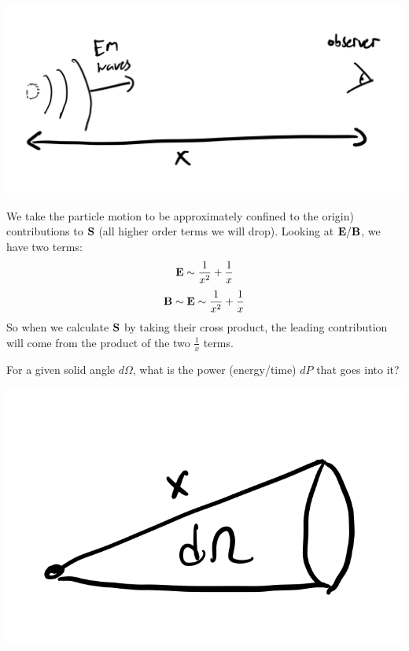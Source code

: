 \begin{center}
    \includegraphics[scale=0.38]{Lectures/Images/lec9-farfield.png}
\end{center}

We take the particle motion to be approximately confined to the origin) contributions to $\mathbf{S}$ (all higher order terms we will drop). Looking at $\mathbf{E}/\mathbf{B}$, we have two terms:
\begin{equation}
    \mathbf{E} \sim \frac{1}{x^2} + \frac{1}{x}
\end{equation}
\begin{equation}
    \mathbf{B} \sim \mathbf{E} \sim \frac{1}{x^2} + \frac{1}{x}
\end{equation}
So when we calculate $\mathbf{S}$ by taking their cross product, the leading contribution will come from the product of the two $\frac{1}{x}$ terms.

For a given solid angle $d\Omega$, what is the power (energy/time) $dP$ that goes into it? 

\begin{center}
    \includegraphics[scale=0.38]{Lectures/Images/lec9-solidangle.png}
\end{center}

